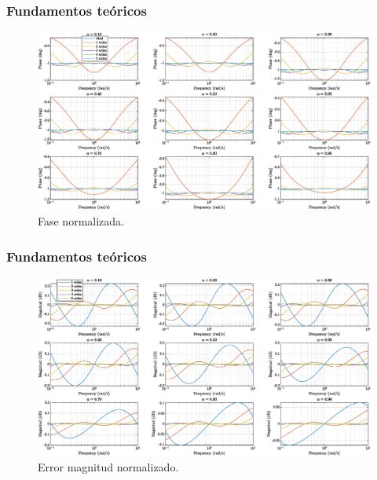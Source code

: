 \documentclass[10pt]{beamer}
\begin{document}
	\begin{frame}
		\frametitle{Fundamentos teóricos}
		\begin{figure}[hbtp]
			\caption{Fase normalizada.}
			\centering
			\includegraphics[trim={0cm 0cm 0cm 0.2cm},clip,width=1.3\textheight]{../imagenes/F7_bode_fase_norm_c.eps}
		\end{figure}
	\end{frame}	
	\begin{frame}
		\frametitle{Fundamentos teóricos}
		\begin{figure}[hbtp]
			\caption{Error magnitud normalizado.}
			\centering
			\includegraphics[trim={0cm 0cm 0cm 0.2cm},clip,width=1.3\textheight]{../imagenes/F8_bode_error_mag_norm_c.eps}
		\end{figure}
	\end{frame}	
\end{document}
